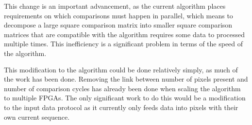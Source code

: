 This change is an important advancement, as the current algorithm places requirements on which comparisons must happen in parallel, which means to decompose a large square comparison matrix into smaller square comparison matrices that are compatible with the algorithm requires some data to processed multiple times. This inefficiency is a significant problem in terms of the speed of the algorithm.

This modification to the algorithm could be done relatively simply, as much of the work has been done. Removing the link between number of pixels present and number of comparison cycles has already been done when scaling the algorithm to multiple FPGAs. The only significant work to do this would be a modification to the input data protocol as it currently only feeds data into pixels with their own current sequence.

